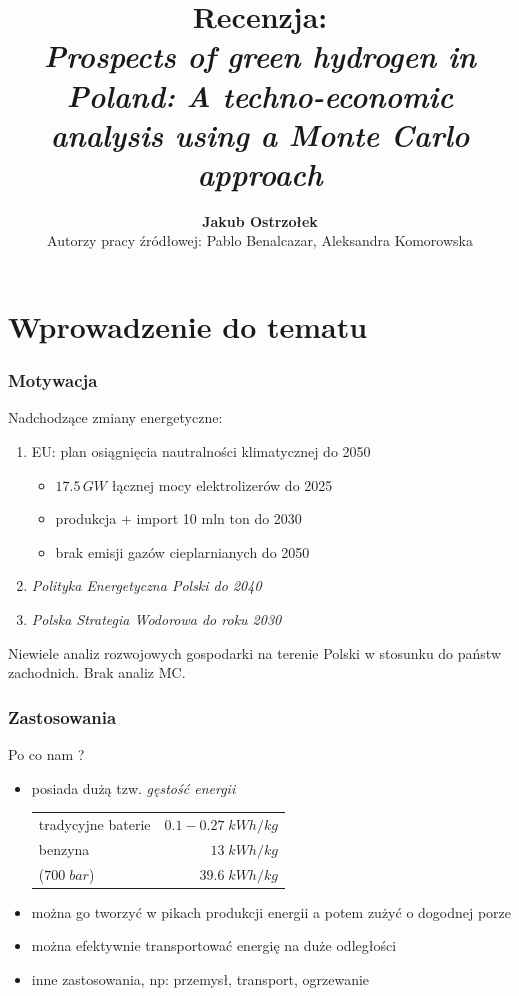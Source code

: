\documentclass{beamer}
\title[Prospects of green hydrogen in Poland \insertframenumber/\inserttotalframenumber]{
  Recenzja: \\%
  \emph{Prospects of green hydrogen in Poland:
  A techno-economic analysis using a Monte Carlo approach}}
\author[Jakub Ostrzołek]{\textbf{Jakub Ostrzołek} \\%
\footnotesize Autorzy pracy źródłowej: Pablo Benalcazar, Aleksandra Komorowska}
\institute{Instytut Automatyki i Informatyki Stosowanej\\%
Politechnika Warszawska}
\newcommand{\HH}{\ce{H2}\xspace}
\begin{document}
\frame{\titlepage}


\section{Wprowadzenie do tematu}

\begin{frame}
	\frametitle{Motywacja}
	Nadchodzące zmiany energetyczne:
	\begin{enumerate}
		\item EU: plan osiągnięcia nautralności klimatycznej do 2050
		      \begin{itemize}
			      \item $17.5 \, GW$ łącznej mocy elektrolizerów \HH do 2025
			      \item produkcja + import 10 mln ton \HH do 2030
			      \item brak emisji gazów cieplarnianych do 2050
		      \end{itemize}
		\item \emph{Polityka Energetyczna Polski do 2040}
		\item \emph{Polska Strategia Wodorowa do roku 2030}
	\end{enumerate}
	Niewiele analiz rozwojowych gospodarki \HH na terenie Polski w stosunku do państw zachodnich. Brak analiz MC.
\end{frame}

\begin{frame}
	\frametitle{Zastosowania \HH}
	Po co nam \HH?
	\begin{itemize}
		\item posiada dużą tzw. \emph{gęstość energii}

		      \begin{tabular}{ l r }
			      tradycyjne baterie & $0.1 - 0.27 \; kWh/kg$ \\
			      benzyna            & $13 \; kWh/kg$         \\
			      \HH ($700 \; bar$) & $39.6 \; kWh/kg$
		      \end{tabular}
		\item można go tworzyć w pikach produkcji energii a potem zużyć o dogodnej porze
		\item można efektywnie transportować energię na duże odległości
		\item inne zastosowania, np: przemysł, transport, ogrzewanie
	\end{itemize}
\end{frame}
\end{document}
